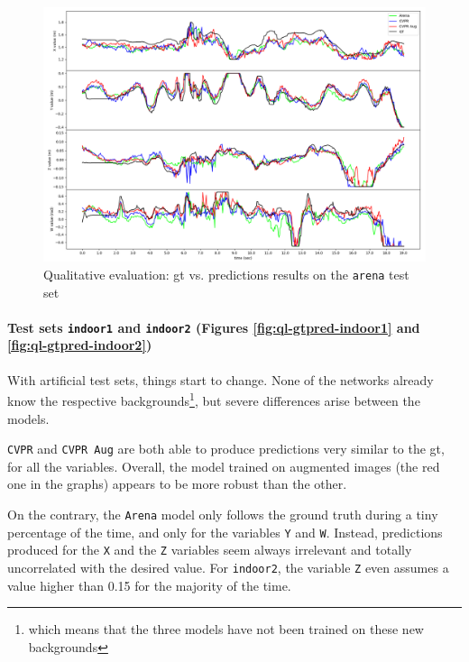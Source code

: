 \begin{figure}[!h]
	\centering
	\includegraphics[width=1 \textwidth]{"contents/images/06-gtpred-arena"}
	\caption[Qualitative evaluation: \gls{gt} vs. predictions results on the \texttt{arena} test set]{Qualitative evaluation: \gls{gt} vs. predictions results on the \texttt{arena} test set}
	\label{fig:ql-gtpred-arena}
\end{figure}


\paragraph*{Test sets \texttt{indoor1} and \texttt{indoor2} (Figures \ref{fig:ql-gtpred-indoor1} and \ref{fig:ql-gtpred-indoor2})}

With artificial test sets, things start to change. None of the networks already know the respective backgrounds\footnote{which means that the three models have not been trained on these new backgrounds}, but severe differences arise between the models. 

\texttt{CVPR} and \texttt{CVPR Aug} are both able to produce predictions very similar to the \gls{gt}, for all the variables. Overall, the model trained on augmented images (the red one in the graphs) appears to be more robust than the other.

On the contrary, the \texttt{Arena} model only follows the ground truth during a tiny percentage of the time, and only for the variables \texttt{Y} and \texttt{W}. Instead, predictions produced for the \texttt{X} and the \texttt{Z} variables seem always irrelevant and totally uncorrelated with the desired value. For \texttt{indoor2}, the variable \texttt{Z} even assumes a value higher than 0.15 for the majority of the time.

